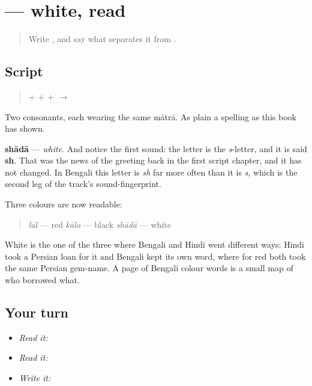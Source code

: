 \section[\texorpdfstring{\bn{সাদা} (shādā)}{সাদা (shādā)}]{ — white, read}

\label{lesson:BN-W03-shada-read}



\begin{quote}
Write \textbf{}, and say what separates it from \textbf{}.
\end{quote}

\subsection*{Script}
\begin{quote}
\textbf{} + \textbf{} + \textbf{} + \textbf{} $\to$ \textbf{}
\end{quote}

Two consonants, each wearing the same mātrā. As plain a spelling as this book has shown.

\textbf{shādā} — \emph{white}. And notice the first sound: the letter is the \emph{s}-letter, and it is said \textbf{sh}. That was the news of the greeting back in the first script chapter, and it has not changed. In Bengali this letter is \emph{sh} far more often than it is \emph{s}, which is the second leg of the track's sound-fingerprint.

Three colours are now readable:

\begin{quote}
\textbf{} \emph{lāl} — red \textbf{} \emph{kālo} — black \textbf{} \emph{shādā} — white
\end{quote}

White is the one of the three where Bengali and Hindi went different ways: Hindi took a Persian loan for it and Bengali kept its own word, where for red both took the same Persian gem-name. A page of Bengali colour words is a small map of who borrowed what.

\subsection*{Your turn}
\begin{itemize}
\raggedright
  \item \emph{Read it:} 
  \item \emph{Read it:}   
  \item \emph{Write it:} 
\end{itemize}

